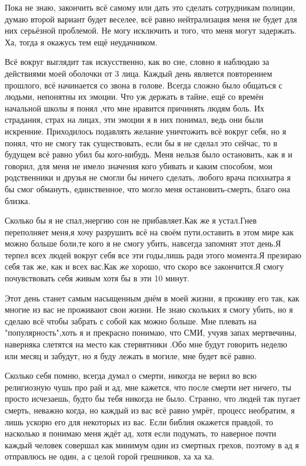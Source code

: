 \begin{itemize}
\begin{itemize}
Пока не знаю, закончить всё самому или дать это сделать сотрудникам
полиции, думаю второй вариант будет веселее, всё равно нейтрализация меня не
будет для них серьёзной проблемой. Не могу исключить и того, что меня могут
задержать. Ха, тогда я окажусь тем ещё неудачником.

Всё вокруг выглядит так искусственно, как во сне, словно я наблюдаю за действиями
моей оболочки от 3 лица. Каждый день является повторением прошлого, всё
начинается со звона в голове. Всегда сложно было общаться с людьми, непонятны их
эмоции. Что уж держать в тайне, ещё со времён начальной школы я понял ,что мне
нравится причинять людям боль. Их страдания, страх на лицах, эти эмоции я в них
понимал, ведь они были искренние. Приходилось подавлять желание уничтожить всё
вокруг себя, но я понял, что не смогу так существовать, если бы я не сделал это
сейчас, то в будущем всё равно убил бы кого-нибудь. Меня нельзя было
остановить, как я и говорил, для меня не имело значения кого убивать и каким
способом, мои родственники и друзья не смогли бы ничего сделать, любого врача
психиатра я бы смог обмануть, единственное, что могло меня
остановить-смерть, благо она близка.

Сколько бы я не спал,энергию сон не прибавляет.Как же я устал.Гнев переполняет
меня,я хочу разрушить всё на своём пути,оставить в этом мире как можно больше
боли,те кого я не смогу убить, навсегда запомнят этот день.Я терпел всех людей
вокруг себя все эти годы,лишь ради этого момента.Я презираю себя так же, как и
всех вас.Как же хорошо, что скоро все закончится.Я смогу почувствовать себя
живым хотя бы в эти 10 минут.

Этот день станет самым насыщенным днём в моей жизни, я проживу его так, как
многие из вас не проживают свои жизни. Не знаю скольких я смогу убить, но я
сделаю всё чтобы забрать с собой как можно больше. Мне плевать на
"популярность",хоть я и прекрасно понимаю, что СМИ, учуяв запах мертвечины,
наверняка слетятся на место как стервятники .Обо мне будут говорить неделю или
месяц и забудут, но я буду лежать в могиле, мне будет всё равно.



Сколько себя помню, всегда думал о смерти, никогда не верил во всю религиозную
чушь про рай и ад, мне кажется, что после смерти нет ничего, ты просто
исчезаешь, будто бы тебя никогда не было. Странно, что людей так пугает
смерть, неважно когда, но каждый из вас всё равно умрёт, процесс необратим, я лишь
ускорю его для некоторых из вас. Если библия окажется правдой, то насколько я
понимаю меня ждёт ад, хотя если подумать, то наверное почти каждый человек
совершал как минимум один из смертных грехов, поэтому в ад я отправлюсь не
один, а с целой горой грешников, ха ха ха.


\end{itemize}
\end{itemize}
